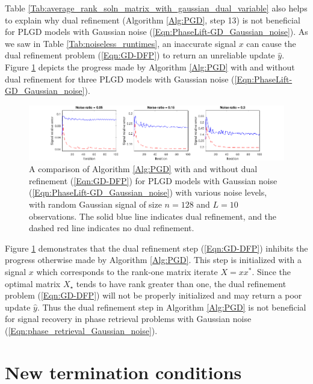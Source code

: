 Table \ref{Tab:average_rank_soln_matrix_with_gaussian_dual_variable} also helps to explain why dual refinement (Algorithm \ref{Alg:PGD}, step 13) is not beneficial for PLGD models with Gaussian noise (\ref{Eqn:PhaseLift-GD_Gaussian_noise}).  As we saw in Table \ref{Tab:noiseless_runtimes}, an inaccurate signal $x$ can cause the dual refinement problem (\ref{Eqn:GD-DFP}) to return an unreliable update $\hat{y}$.  Figure \ref{Fig:noisy_random_DFP_vs_no_DFP} depicts the progress made by Algorithm \ref{Alg:PGD} with and without dual refinement for three PLGD models with Gaussian noise (\ref{Eqn:PhaseLift-GD_Gaussian_noise}).

\begin{figure}[H]
\hspace{-1.6cm}  \includegraphics[scale=0.6]{noisy_random_signal_DFP_vs_no_DFP}
\caption{A comparison of Algorithm \ref{Alg:PGD} with and without dual refinement (\ref{Eqn:GD-DFP}) for PLGD models with Gaussian noise (\ref{Eqn:PhaseLift-GD_Gaussian_noise}) with various noise levels, with random Gaussian signal of size $n = 128$ and $L = 10$ observations.  The solid blue line indicates dual refinement, and the dashed red line indicates no dual refinement.}
\label{Fig:noisy_random_DFP_vs_no_DFP}
\end{figure}



Figure \ref{Fig:noisy_random_DFP_vs_no_DFP} demonstrates that the dual refinement step (\ref{Eqn:GD-DFP})  inhibits the progress otherwise made by Algorithm \ref{Alg:PGD}.  This step is initialized with a signal $x$ which corresponds to the rank-one matrix iterate $X = xx^*$.  Since the optimal matrix $X_\star$ tends to have rank greater than one, the dual refinement problem (\ref{Eqn:GD-DFP}) will not be properly initialized and may return a poor update $\hat{y}$.  Thus the dual refinement step in Algorithm \ref{Alg:PGD} is not beneficial for signal recovery in phase retrieval problems with Gaussian noise (\ref{Eqn:phase_retrieval_Gaussian_noise}).





\section{New termination conditions}  	\label{Subsec:PLGD_term_crit-new_term_crit}


